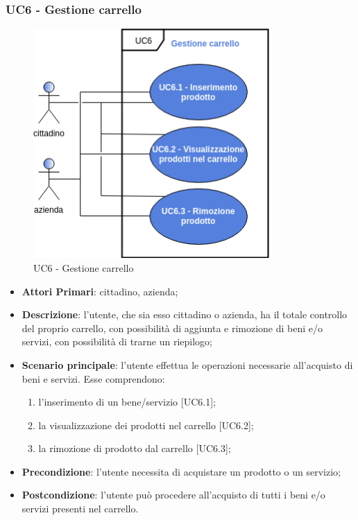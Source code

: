 \subsubsection{UC6 - Gestione carrello}
 \begin{figure}[h]
	\includegraphics[width=9cm]{res/images/UC6GestioneCarrello.png}
	\centering
	\caption{UC6 - Gestione carrello}
\end{figure}
\begin{itemize}
	\item \textbf{Attori Primari}: cittadino, azienda\glo;
	\item \textbf{Descrizione}: l'utente, che sia esso cittadino o azienda, ha il totale controllo del proprio carrello, con possibilità di aggiunta e rimozione di beni e/o servizi, con possibilità di trarne un riepilogo;
	\item \textbf{Scenario principale}: l'utente effettua le operazioni necessarie all'acquisto di beni e servizi. Esse comprendono:
	\begin{enumerate}[label=\alph*.]
		\item l'inserimento di un bene/servizio [UC6.1];
		\item la visualizzazione dei prodotti nel carrello [UC6.2];
		\item la rimozione di prodotto dal carrello [UC6.3];
	\end{enumerate}
	\item \textbf{Precondizione}: l'utente necessita di acquistare un prodotto o un servizio;
	\item \textbf{Postcondizione}: l'utente può procedere all'acquisto di tutti i beni e/o servizi presenti nel carrello.
\end{itemize} 
